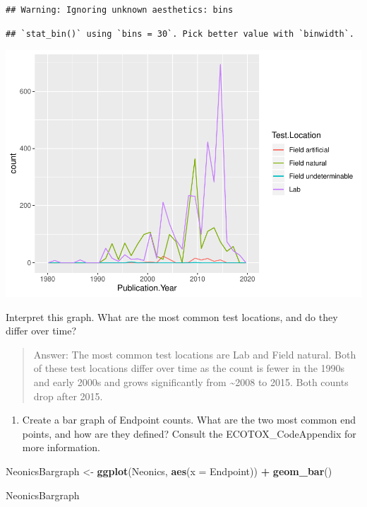 \documentclass[]{article}
\newenvironment{Shaded}{\begin{snugshade}}{\end{snugshade}}
\newcommand{\KeywordTok}[1]{\textcolor[rgb]{0.13,0.29,0.53}{\textbf{#1}}}
\newcommand{\DataTypeTok}[1]{\textcolor[rgb]{0.13,0.29,0.53}{#1}}
\newcommand{\StringTok}[1]{\textcolor[rgb]{0.31,0.60,0.02}{#1}}
\newcommand{\OperatorTok}[1]{\textcolor[rgb]{0.81,0.36,0.00}{\textbf{#1}}}
\newcommand{\NormalTok}[1]{#1}
\providecommand{\tightlist}{%
  \setlength{\itemsep}{0pt}\setlength{\parskip}{0pt}}
\begin{document}
\begin{verbatim}
## Warning: Ignoring unknown aesthetics: bins
\end{verbatim}

\begin{verbatim}
## `stat_bin()` using `bins = 30`. Pick better value with `binwidth`.
\end{verbatim}

\includegraphics{A03_DataExploration_files/figure-latex/unnamed-chunk-7-1.pdf}

Interpret this graph. What are the most common test locations, and do
they differ over time?

\begin{quote}
Answer: The most common test locations are Lab and Field natural. Both
of these test locations differ over time as the count is fewer in the
1990s and early 2000s and grows significantly from \textasciitilde{}2008
to 2015. Both counts drop after 2015.
\end{quote}

\begin{enumerate}
\def\labelenumi{\arabic{enumi}.}
\setcounter{enumi}{10}
\tightlist
\item
  Create a bar graph of Endpoint counts. What are the two most common
  end points, and how are they defined? Consult the ECOTOX\_CodeAppendix
  for more information.
\end{enumerate}

\begin{Shaded}
\begin{Highlighting}[]
\NormalTok{NeonicsBargraph <-}\StringTok{ }\KeywordTok{ggplot}\NormalTok{(Neonics, }\KeywordTok{aes}\NormalTok{(}\DataTypeTok{x =}\NormalTok{ Endpoint)) }\OperatorTok{+}
\StringTok{  }\KeywordTok{geom_bar}\NormalTok{()}

\NormalTok{NeonicsBargraph}
\end{Highlighting}
\end{Shaded}
\end{document}
